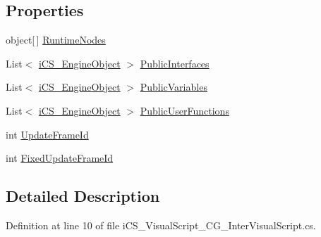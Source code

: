 \subsection*{Properties}
\begin{DoxyCompactItemize}
\item 
object\mbox{[}$\,$\mbox{]} \hyperlink{classi_c_s___visual_script_imp_a6680b94de835fdda4782e9f90ad18d29}{Runtime\+Nodes}
\item 
List$<$ \hyperlink{classi_c_s___engine_object}{i\+C\+S\+\_\+\+Engine\+Object} $>$ \hyperlink{classi_c_s___visual_script_imp_a2d3c97fc922c812d129df69996106521}{Public\+Interfaces}
\item 
List$<$ \hyperlink{classi_c_s___engine_object}{i\+C\+S\+\_\+\+Engine\+Object} $>$ \hyperlink{classi_c_s___visual_script_imp_a9a7b7f09a25bfb7f4fae04eb584e9311}{Public\+Variables}
\item 
List$<$ \hyperlink{classi_c_s___engine_object}{i\+C\+S\+\_\+\+Engine\+Object} $>$ \hyperlink{classi_c_s___visual_script_imp_ac269568fa4792d3b9a6d09d5f36cf3c5}{Public\+User\+Functions}
\item 
int \hyperlink{classi_c_s___visual_script_imp_ac147c22b35c789347db9f446cf432783}{Update\+Frame\+Id}
\item 
int \hyperlink{classi_c_s___visual_script_imp_a763258147d8fe054e5e09777448cfb48}{Fixed\+Update\+Frame\+Id}
\end{DoxyCompactItemize}


\subsection{Detailed Description}


Definition at line 10 of file i\+C\+S\+\_\+\+Visual\+Script\+\_\+\+C\+G\+\_\+\+Inter\+Visual\+Script.\+cs.



